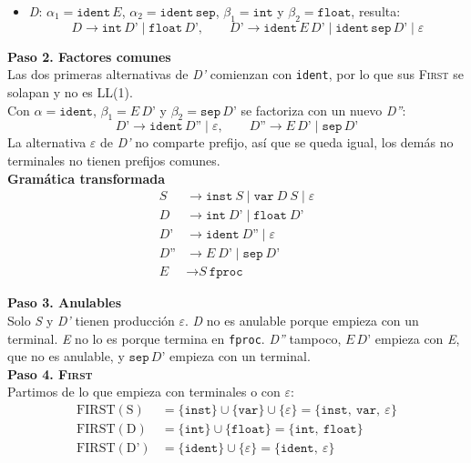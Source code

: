 \documentclass[12pt,letterpaper]{article}
\newcommand{\nt}[1]{\textit{#1}}
\newcommand{\tk}[1]{\texttt{#1}}
\newcommand{\tx}[1]{\text{#1}}
\newcommand{\First}[1]{\mathrm{FIRST}(#1)}
\newcommand{\eps}{\varepsilon}
\begin{document}
\begin{enumerate}[label=\arabic*.]
\begin{itemize}
\begin{itemize}
    \item \nt{D}: $\alpha_1=\tk{ident}\,\nt{E}$, $\alpha_2=\tk{ident}\,\tk{sep}$, $\beta_1=\tk{int}$ y
      $\beta_2=\tk{float}$, resulta:
      \[
      \nt{D}\to\tk{int}\,\nt{D'}\mid\tk{float}\,\nt{D'},\qquad
      \nt{D'}\to\tk{ident}\,\nt{E}\,\nt{D'}\mid\tk{ident}\,\tk{sep}\,\nt{D'}\mid\eps
      \]
    \end{itemize}

    \textbf{Paso 2. Factores comunes}\\
    Las dos primeras alternativas de \nt{D'} comienzan con \tk{ident}, por lo que sus \textsc{First} se
    solapan y no es LL(1).\\
    Con $\alpha=\tk{ident}$, $\beta_1=\nt{E}\,\nt{D'}$ y $\beta_2=\tk{sep}\,\nt{D'}$ se factoriza con un nuevo
    \nt{D''}:
    \[
    \nt{D'}\to\tk{ident}\,\nt{D''}\mid\eps,\qquad
    \nt{D''}\to\nt{E}\,\nt{D'}\mid\tk{sep}\,\nt{D'}
    \]
    La alternativa $\eps$ de \nt{D'} no comparte prefijo, así que se queda igual, los demás no terminales no
    tienen prefijos comunes.\\

    \textbf{Gramática transformada}
    \[
    \begin{aligned}
      \nt{S}   &\to \tk{inst}\ \nt{S} \mid \tk{var}\ \nt{D}\ \nt{S} \mid \eps \\
      \nt{D}   &\to \tk{int}\ \nt{D'} \mid \tk{float}\ \nt{D'} \\
      \nt{D'}  &\to \tk{ident}\ \nt{D''} \mid \eps \\
      \nt{D''} &\to \nt{E}\ \nt{D'} \mid \tk{sep}\ \nt{D'} \\
      \nt{E}   &\to \nt{S}\ \tk{fproc}
    \end{aligned}
    \]

    \textbf{Paso 3. Anulables}\\
    Solo \nt{S} y \nt{D'} tienen producción $\eps$. \nt{D} no es anulable porque empieza con un terminal.
    \nt{E} no lo es porque termina en \tk{fproc}. \nt{D''} tampoco, $\nt{E}\,\nt{D'}$ empieza con \nt{E}, que
    no es anulable, y $\tk{sep}\,\nt{D'}$ empieza con un terminal.\\

    \textbf{Paso 4. \textsc{First}}\\
    Partimos de lo que empieza con terminales o con $\eps$:
    \[
    \begin{aligned}
      \First{\tx{S}}  &= \{\tk{inst}\} \cup \{\tk{var}\} \cup \{\eps\} = \{\tk{inst},\ \tk{var},\ \eps\} \\
      \First{\tx{D}}  &= \{\tk{int}\} \cup \{\tk{float}\} = \{\tk{int},\ \tk{float}\} \\
      \First{\tx{D'}} &= \{\tk{ident}\} \cup \{\eps\} = \{\tk{ident},\ \eps\}
    \end{aligned}
    \]
    

\end{itemize}
\end{enumerate}
\end{document}
